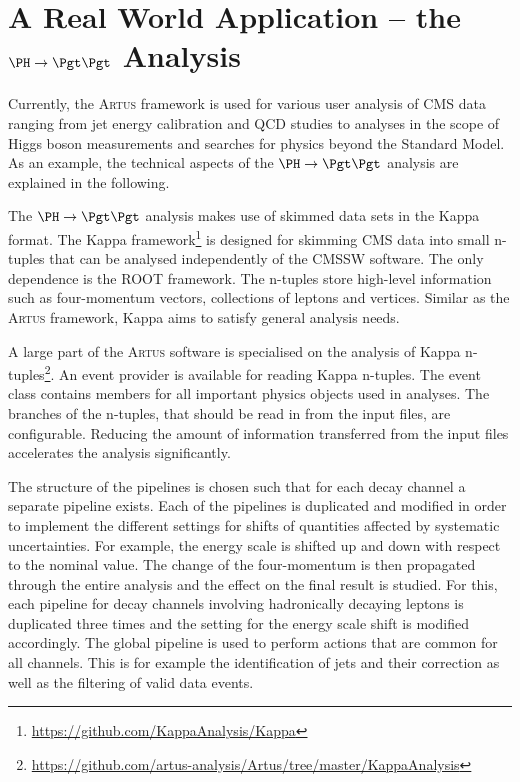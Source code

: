 \documentclass[3p]{elsarticle}
\newcommand{\software}[1]{\textsc{#1}\xspace}
\newcommand{\artus}{\software{Artus}}
\begin{document}
\section{A Real World Application -- the $\PH\to\Pgt\Pgt$ Analysis \label{section_artus_example_htt}}

Currently, the \artus framework is used for various user analysis of CMS data ranging from jet energy calibration and QCD studies to analyses in the scope of Higgs boson measurements and searches for physics beyond the Standard Model.
As an example, the technical aspects of the $\PH\to\Pgt\Pgt$ analysis are explained in the following.

The $\PH\to\Pgt\Pgt$ analysis makes use of skimmed data sets in the Kappa format.
The Kappa framework\footnote{\url{https://github.com/KappaAnalysis/Kappa}} is designed for skimming CMS data into small n-tuples that can be analysed independently of the CMSSW software.
The only dependence is the ROOT framework.
The n-tuples store high-level information such as four-momentum vectors, collections of leptons and vertices.
Similar as the \artus framework, Kappa aims to satisfy general analysis needs.

A large part of the \artus software is specialised on the analysis of Kappa n-tuples\footnote{\url{https://github.com/artus-analysis/Artus/tree/master/KappaAnalysis}}.
An event provider is available for reading Kappa n-tuples.
The event class contains members for all important physics objects used in analyses.
The branches of the n-tuples, that should be read in from the input files, are configurable.
Reducing the amount of information transferred from the input files accelerates the analysis significantly.

The structure of the pipelines is chosen such that for each decay channel a separate pipeline exists.
Each of the pipelines is duplicated and modified in order to implement the different settings for shifts of quantities affected by systematic uncertainties.
For example, the \Pgt energy scale is shifted up and down with respect to the nominal value.
The change of the \Pgt four-momentum is then propagated through the entire analysis and the effect on the final result is studied.
For this, each pipeline for decay channels involving hadronically decaying \Pgt leptons is duplicated three times and the setting for the \Pgt energy scale shift is modified accordingly.
The global pipeline is used to perform actions that are common for all channels.
This is for example the identification of jets and their correction as well as the filtering of valid data events.
\end{document}
